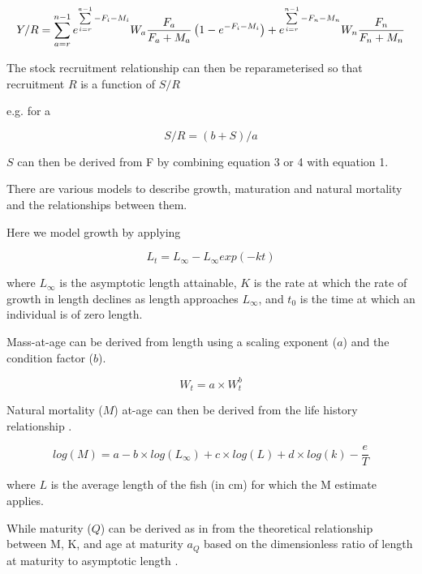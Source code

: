 \documentclass[preprint,authoryear,12pt]{elsarticle}
\begin{document}
\begin{equation} 
Y/R=\sum\limits_{a=r}^{n-1} {e^{\sum\limits_{i=r}^{a-1} {-F_i-M_i}}} W_a\frac{F_a}{F_a+M_a}\left(1-e^{-F_i-M_i} \right) + e^{\sum\limits_{i=r}^{n-1} {-F_n-M_n}} W_n\frac{F_n}{F_n+M_n}\\ 
\end{equation}  
 
The stock recruitment relationship can then be reparameterised so that recruitment $R$ is a function of $S/R$ 
 
e.g. for a \citet{beverton1956review}  
 
\begin{equation} 
S/R=(b+S)/a 	 
\end{equation}  
 
$S$ can then be derived from F by combining equation 3 or 4 with equation 1.  
 
There are various models to describe growth, maturation and natural mortality and the relationships between them. 
 
Here we model growth by applying \citep{von1957quantitative}   
 
\begin{equation} L_t = L_{\infty} - L_{\infty}exp(-kt) \end{equation} 
 
where $L_{\infty}$ is the asymptotic length attainable, $K$ is the rate at which the rate of growth in length declines as length approaches $L_{\infty}$, and $t_{0}$ is the time at 
which an individual is of zero length. 
 
Mass-at-age can be derived from length using a scaling exponent ($a$) and the condition factor ($b$). 
 
\begin{equation} W_t = a \times W_t^b \end{equation} 
 
 
Natural mortality ($M$) at-age can then be derived from the life history relationship \citet{gislason2008does}. 
 
\begin{equation} 
log(M) = a - b \times log(L_{\infty}) + c \times log(L) + d \times log(k) - \frac{e}{T} 
\end{equation}  
 
where $L$ is the average length of the fish (in cm) for which the M estimate applies. 
 
While maturity ($Q$) can be derived as in \citet{williams2003implications} from the theoretical relationship between M, K, and age at maturity $a_{Q}$  
based on the dimensionless ratio of length at maturity to asymptotic length \citep{beverton1992patterns}.  
 
\end{document}
